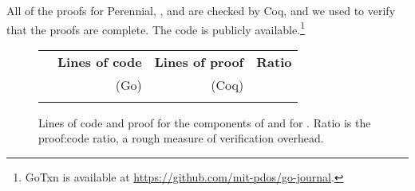 All of the proofs for Perennial, \txn, and \simplenfs are checked by Coq, and we
used  to verify that the proofs are complete.  The
code is publicly available.\footnote{GoTxn is available at
\url{https://github.com/mit-pdos/go-journal}.}


\begin{figure}
\centering
\small
\begin{tabular}{lrrr}
\toprule
  & \bf Lines of code & \bf Lines of proof & \bf Ratio \\
  & (Go) & (Coq) & \\
\midrule
   \\
\bottomrule
\end{tabular}
\caption{Lines of code and proof for the components of \txn and for
\simplenfs. Ratio is the proof:code ratio, a rough measure of verification overhead.}
\label{fig:txn:loc}
\end{figure}



%
% 
%
%
% 
%
